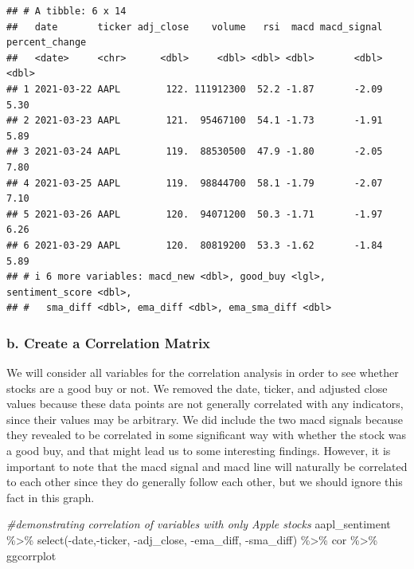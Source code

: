 \documentclass[
]{article}
\newenvironment{Shaded}{\begin{snugshade}}{\end{snugshade}}
\newcommand{\CommentTok}[1]{\textcolor[rgb]{0.56,0.35,0.01}{\textit{#1}}}
\newcommand{\FunctionTok}[1]{\textcolor[rgb]{0.00,0.00,0.00}{#1}}
\newcommand{\NormalTok}[1]{#1}
\newcommand{\SpecialCharTok}[1]{\textcolor[rgb]{0.00,0.00,0.00}{#1}}
\begin{document}
\begin{verbatim}
## # A tibble: 6 x 14
##   date       ticker adj_close    volume   rsi  macd macd_signal percent_change
##   <date>     <chr>      <dbl>     <dbl> <dbl> <dbl>       <dbl>          <dbl>
## 1 2021-03-22 AAPL        122. 111912300  52.2 -1.87       -2.09           5.30
## 2 2021-03-23 AAPL        121.  95467100  54.1 -1.73       -1.91           5.89
## 3 2021-03-24 AAPL        119.  88530500  47.9 -1.80       -2.05           7.80
## 4 2021-03-25 AAPL        119.  98844700  58.1 -1.79       -2.07           7.10
## 5 2021-03-26 AAPL        120.  94071200  50.3 -1.71       -1.97           6.26
## 6 2021-03-29 AAPL        120.  80819200  53.3 -1.62       -1.84           5.89
## # i 6 more variables: macd_new <dbl>, good_buy <lgl>, sentiment_score <dbl>,
## #   sma_diff <dbl>, ema_diff <dbl>, ema_sma_diff <dbl>
\end{verbatim}

\hypertarget{b.-create-a-correlation-matrix}{%
\subsubsection{b. Create a Correlation
Matrix}\label{b.-create-a-correlation-matrix}}

We will consider all variables for the correlation analysis in order to
see whether stocks are a good buy or not. We removed the date, ticker,
and adjusted close values because these data points are not generally
correlated with any indicators, since their values may be arbitrary. We
did include the two macd signals because they revealed to be correlated
in some significant way with whether the stock was a good buy, and that
might lead us to some interesting findings. However, it is important to
note that the macd signal and macd line will naturally be correlated to
each other since they do generally follow each other, but we should
ignore this fact in this graph.

\begin{Shaded}
\begin{Highlighting}[]
\CommentTok{\#demonstrating correlation of variables with only Apple stocks}
\NormalTok{aapl\_sentiment }\SpecialCharTok{\%\textgreater{}\%}
  \FunctionTok{select}\NormalTok{(}\SpecialCharTok{{-}}\NormalTok{date,}\SpecialCharTok{{-}}\NormalTok{ticker, }\SpecialCharTok{{-}}\NormalTok{adj\_close, }\SpecialCharTok{{-}}\NormalTok{ema\_diff, }\SpecialCharTok{{-}}\NormalTok{sma\_diff) }\SpecialCharTok{\%\textgreater{}\%}
\NormalTok{  cor }\SpecialCharTok{\%\textgreater{}\%}
\NormalTok{  ggcorrplot}
\end{Highlighting}
\end{Shaded}
\end{document}
